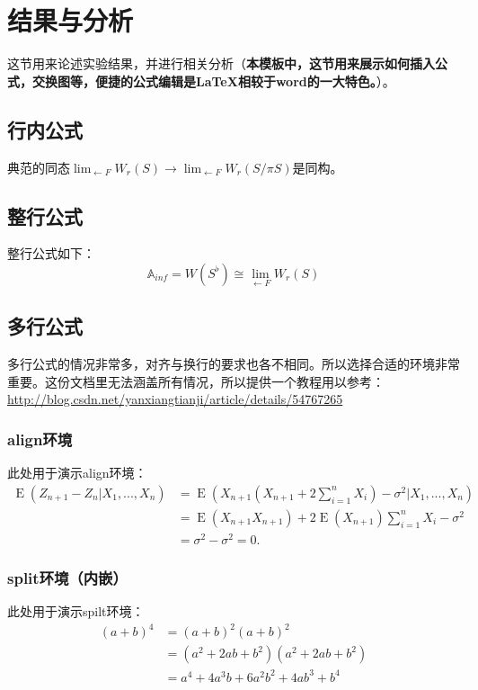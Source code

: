 \section{结果与分析}这节用来论述实验结果，并进行相关分析（\textbf{本模板中，这节用来展示如何插入公式，交换图等，便捷的公式编辑是LaTeX相较于word的一大特色。}）。
 
\subsection{行内公式}
典范的同态$\lim_{\leftarrow F} W_r(S)\rightarrow \lim_{\leftarrow F} W_r(S/\pi S )$是同构。%

\subsection{整行公式}
整行公式如下：
$$\mathbb{A}_{inf}=W(S^\flat)\cong \lim_{\leftarrow F} W_r(S)$$ %

\subsection{多行公式}
\begin{sloppypar}
多行公式的情况非常多，对齐与换行的要求也各不相同。所以选择合适的环境非常重要。这份文档里无法涵盖所有情况，所以提供一个教程用以参考：\url{http://blog.csdn.net/yanxiangtianji/article/details/54767265}
\end{sloppypar}



\subsubsection{align环境}
此处用于演示align环境：
\begin{align*}
    \operatorname{E} (Z_{n+1} - Z_n | X_1,..., X_n)
    &= \operatorname{E} (X_{n+1}(X_{n+1} + 2\sum_{i=1}^n X_i) - \sigma^2 | X_1,..., X_n) \\
    &= \operatorname{E} (X_{n+1}X_{n+1})
       + 2\operatorname{E} (X_{n+1}) \sum_{i=1}^n X_i - \sigma^2 \\
    &= \sigma^2  - \sigma^2 =0.
\end{align*}

\subsubsection{split环境（内嵌）}
此处用于演示spilt环境：
\begin{equation*}
    \begin{split}
    (a + b)^4
      &= (a + b)^2 (a + b)^2      \\
      &= (a^2 + 2ab + b^2)
         (a^2 + 2ab + b^2)        \\
      &= a^4 + 4a^3b + 6a^2b^2 + 4ab^3 + b^4
    \end{split}
\end{equation*}

